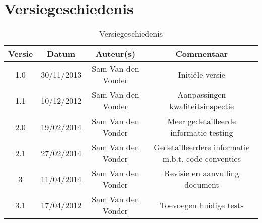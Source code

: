 \chapter{Versiegeschiedenis}

\begin{table}[htbp]
	\centering
	\caption{Versiegeschiedenis}
	\begin{tabular} {|c|c|c|c|}
	    \hline
		\textbf{Versie} & \textbf{Datum} 	& \textbf{Auteur(s)} & \textbf{Commentaar} \\
		\hline
		1.0	& 30/11/2013	& Sam Van den Vonder & Initi\"{e}le versie \\ \hline
		1.1 & 10/12/2012	& Sam Van den Vonder & Aanpassingen kwaliteitsinspectie \\ \hline
		2.0 & 19/02/2014	& Sam Van den Vonder & Meer gedetailleerde informatie testing \\ \hline
		2.1 & 27/02/2014	& Sam Van den Vonder & Gedetailleerdere informatie m.b.t. code conventies \\ \hline
		3	& 11/04/2014	& Sam Van den Vonder & Revisie en aanvulling document \\ \hline
		3.1 & 17/04/2012	& Sam Van den Vonder & Toevoegen huidige tests \\ \hline
	\end{tabular}
\end{table}